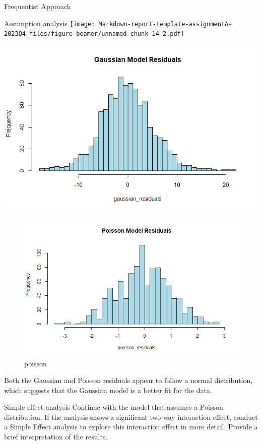 \documentclass[
  ignorenonframetext,
]{beamer}
\begin{document}
\begin{frame}[fragile]{Frequentist Approach}
\begin{block}{Assumption analysis}
\texttt{[image: Markdown-report-template-assignmentA-2023Q4\_files/figure-beamer/unnamed-chunk-14-2.pdf]}

\includegraphics{gaussian.jpg}

\begin{figure}
\centering
\includegraphics{poisson.jpg}
\caption{poisson}
\end{figure}

Both the Gaussian and Poisson residuals appear to follow a normal
distribution, which suggests that the Gaussian model is a better fit for
the data.
\end{block}

\begin{block}{Simple effect analysis}
\protect\hypertarget{simple-effect-analysis}{}
Continue with the model that assumes a Poisson distribution. If the
analysis shows a significant two-way interaction effect, conduct a
Simple Effect analysis to explore this interaction effect in more
detail. Provide a brief interpretation of the results.


\end{block}
\end{frame}
\end{document}
